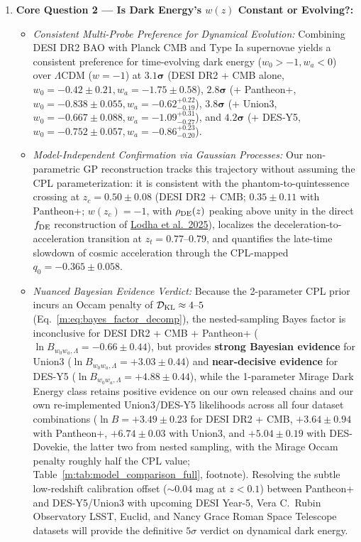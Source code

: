 \documentclass[aps,prd,preprint,superscriptaddress,nofootinbib]{revtex4-2}
\begin{document}
\begin{enumerate}
\begin{itemize}
    \end{itemize}
    \item \textbf{Core Question 2 --- Is Dark Energy's $w(z)$ Constant or Evolving?:}
    \begin{itemize}
        \setlength{\itemsep}{2pt}
        \item \emph{Consistent Multi-Probe Preference for Dynamical Evolution:} Combining DESI DR2 BAO with Planck CMB and Type Ia supernovae yields a consistent preference for time-evolving dark energy ($w_0 > -1, w_a < 0$) over $\Lambda$CDM ($w=-1$) at $\mathbf{3.1}\boldsymbol{\sigma}$ (DESI DR2 + CMB alone, $w_0 = -0.42 \pm 0.21, w_a = -1.75 \pm 0.58$), $\mathbf{2.8}\boldsymbol{\sigma}$ (+ Pantheon+, $w_0 = -0.838 \pm 0.055, w_a = -0.62^{+0.22}_{-0.19}$), $\mathbf{3.8}\boldsymbol{\sigma}$ (+ Union3, $w_0 = -0.667 \pm 0.088, w_a = -1.09^{+0.31}_{-0.27}$), and $\mathbf{4.2}\boldsymbol{\sigma}$ (+ DES-Y5, $w_0 = -0.752 \pm 0.057, w_a = -0.86^{+0.23}_{-0.20}$).
        \item \emph{Model-Independent Confirmation via Gaussian Processes:} Our non-parametric GP reconstruction tracks this trajectory without assuming the CPL parameterization: it is consistent with the phantom-to-quintessence crossing at $z_c = 0.50 \pm 0.08$ (DESI DR2 + CMB; $0.35 \pm 0.11$ with Pantheon+; $w(z_c) = -1$, with $\rho_{\rm DE}(z)$ peaking above unity in the direct $f_{\rm DE}$ reconstruction of \href{https://arxiv.org/abs/2503.14743}{Lodha et al.\ 2025}), localizes the deceleration-to-acceleration transition at $z_t = 0.77\text{--}0.79$, and quantifies the late-time slowdown of cosmic acceleration through the CPL-mapped $q_0 = -0.365 \pm 0.058$.
        \item \emph{Nuanced Bayesian Evidence Verdict:} Because the 2-parameter CPL prior incurs an Occam penalty of $\mathcal{D}_{\rm KL} \approx 4\text{--}5$ (Eq.~\ref{m:eq:bayes_factor_decomp}), the nested-sampling Bayes factor is inconclusive for DESI DR2 + CMB + Pantheon+ ($\ln B_{w_0 w_a, \Lambda} = -0.66 \pm 0.44$), but provides \textbf{strong Bayesian evidence} for Union3 ($\ln B_{w_0 w_a, \Lambda} = +3.03 \pm 0.44$) and \textbf{near-decisive evidence} for DES-Y5 ($\ln B_{w_0 w_a, \Lambda} = +4.88 \pm 0.44$), while the 1-parameter Mirage Dark Energy class retains positive evidence on our own released chains and our own re-implemented Union3/DES-Y5 likelihoods across all four dataset combinations ($\ln B = +3.49 \pm 0.23$ for DESI DR2 + CMB, $+3.64 \pm 0.94$ with Pantheon+, $+6.74 \pm 0.03$ with Union3, and $+5.04 \pm 0.19$ with DES-Dovekie, the latter two from nested sampling, with the Mirage Occam penalty roughly half the CPL value; Table~\ref{m:tab:model_comparison_full}, footnote). Resolving the subtle low-redshift calibration offset ($\sim 0.04\text{ mag}$ at $z < 0.1$) between Pantheon+ and DES-Y5/Union3 with upcoming DESI Year-5, Vera C.\ Rubin Observatory LSST, Euclid, and Nancy Grace Roman Space Telescope datasets will provide the definitive $5\sigma$ verdict on dynamical dark energy.
    \end{itemize}
\end{enumerate}
\end{document}
